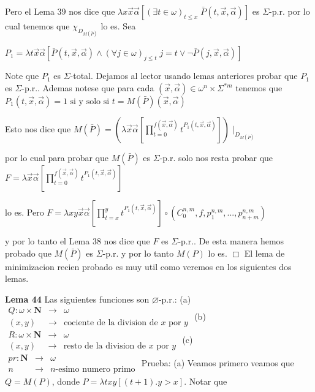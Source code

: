 Pero el Lema 39 nos dice que \(\lambda x\vec{x}\vec{\alpha} \left[ (\exists t\in \omega )_{t\leq x}\;\bar{P}(t,\vec{x},\vec{\alpha}) \right] \) es \(\Sigma \)-p.r. por lo cual tenemos que \(\chi _{D_{M(\bar{P})}}\) lo es.
Sea

\(\displaystyle P_{1}=\lambda t\vec{x}\vec{\alpha}\left[ \bar{P}(t,\vec{x},\vec{\alpha} )\wedge (\forall j\in \omega )_{j\leq t}\;j=t\vee \lnot \bar{P}(j,\vec{x}, \vec{\alpha})\right] \)

Note que \(P_{1}\) es \(\Sigma \)-total. Dejamos al lector usando lemas anteriores probar que \(P_{1}\) es \(\Sigma \)-p.r.. Ademas notese que para cada \((\vec{x},\vec{\alpha})\in \omega ^{n}\times \Sigma ^{\ast m}\) tenemos que
\(\displaystyle P_{1}(t,\vec{x},\vec{\alpha})=1\text{ si y solo si }t=M(\bar{P})(\vec{x}, \vec{\alpha}) \)

Esto nos dice que
\(\displaystyle M(\bar{P})=\left( \lambda \vec{x}\vec{\alpha}\left[ \prod_{t=0}^{f(\vec{x}, \vec{\alpha})}t^{P_{1}(t,\vec{x},\vec{\alpha})}\right] \right) \mid _{D_{M( \bar{P})}} \)

por lo cual para probar que \(M(\bar{P})\) es \(\Sigma \)-p.r. solo nos resta probar que
\(\displaystyle F=\lambda \vec{x}\vec{\alpha}\left[ \prod_{t=0}^{f(\vec{x},\vec{\alpha} )}t^{P_{1}(t,\vec{x},\vec{\alpha})}\right] \)

lo es. Pero
\(\displaystyle F=\lambda xy\vec{x}\vec{\alpha}\left[ \prod_{t=x}^{y}t^{P_{1}(t,\vec{x},\vec{ \alpha})}\right] \circ (C_{0}^{n,m},f,p_{1}^{n,m},...,p_{n+m}^{n,m}) \)

y por lo tanto el Lema 38 nos dice que \(F\) es \(\Sigma \)-p.r.. De esta manera hemos probado que \(M(\bar{P})\) es \(\Sigma \)-p.r. y por lo tanto \(M(P)\) lo es. \(\Box\)
El lema de minimizacion recien probado es muy util como veremos en los siguientes dos lemas.



\textbf{Lema 44} Las siguientes funciones son \(\varnothing \)-p.r.:
(a) \( \begin{array}{rll} Q:\omega \times \mathbf{N} & \rightarrow & \omega \\ (x,y) & \rightarrow & \text{cociente de la division de }x\text{ por }y \end{array} \)
(b) \( \begin{array}{rll} R:\omega \times \mathbf{N} & \rightarrow & \omega \\ (x,y) & \rightarrow & \text{resto de la division de }x\text{ por }y \end{array} \)
(c) \( \begin{array}{rll} pr:\mathbf{N} & \rightarrow & \omega \\ n & \rightarrow & n\text{-esimo numero primo} \end{array} \)
Prueba: (a) Veamos primero veamos que \(Q=M(P)\), donde \(P=\lambda txy\left[ (t+1).y >x \right] \). Notar que

